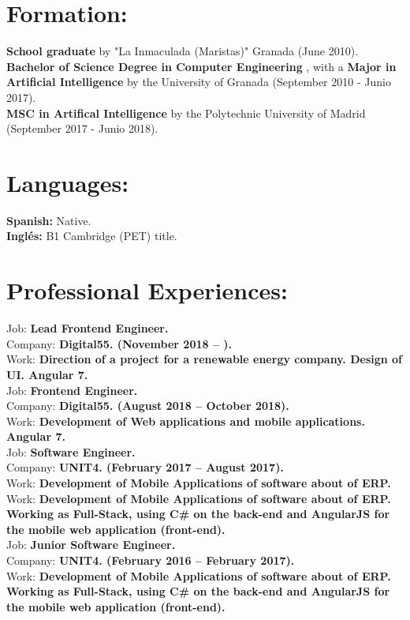 \documentclass	[10pt,a4paper,oneside]{article}
\newcommand{\seccion}[1]{\vspace*{3mm}\section*{#1}\vspace*{-3mm}}
\begin{document}
\seccion{Formation:}
\textbf{School graduate} by "La Inmaculada (Maristas)" Granada (June 2010).\\
\textbf{Bachelor of Science Degree in Computer Engineering} , with a \textbf{Major in Artificial Intelligence} by the University of Granada (September 2010 - Junio 2017).\\
\textbf{MSC in Artifical Intelligence} by the Polytechnic University of Madrid (September 2017 - Junio 2018).\\

\seccion{Languages:}
\textbf{Spanish:} Native.\\
\textbf{Inglés:} B1 Cambridge (PET) title.\\


\seccion{Professional Experiences:}

Job: \textbf{Lead Frontend Engineer.}\\
Company: \textbf{Digital55. (November 2018 – ).}\\
Work: \textbf{Direction of a project for a renewable energy company. Design of UI. Angular 7.}\\

Job: \textbf{Frontend Engineer.}\\
Company: \textbf{Digital55. (August 2018 – October 2018).}\\
Work: \textbf{Development of Web applications and mobile applications. Angular 7.}\\

Job: \textbf{Software Engineer.}\\
Company: \textbf{UNIT4. (February 2017 – August 2017).}\\
Work: \textbf{Development of Mobile Applications of software about of ERP.}\\
Work: \textbf{Development of Mobile Applications of software about of ERP. Working as Full-Stack, using C\# on the back-end and AngularJS for the mobile web application (front-end).}\\

Job: \textbf{Junior Software Engineer.}\\
Company: \textbf{UNIT4. (February 2016 – February 2017).}\\
Work: \textbf{Development of Mobile Applications of software about of ERP. Working as Full-Stack, using C\# on the back-end and AngularJS for the mobile web application (front-end).}\\
\end{document}
